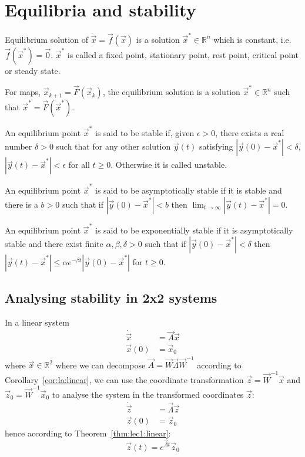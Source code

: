 \section{Equilibria and stability}
Equilibrium solution of $\dot{\vec x} = \vec f(\vec x)$ is a solution $\vec x^\ast \in \mathbb R^n$ which is constant, i.e. $\vec f(\vec x^\ast) = \vec 0$. $\vec x^\ast$ is called a fixed point, stationary point, rest point, critical point or steady state.

For maps, $\vec x_{k + 1} = \vec F(\vec x_k)$, the equilibrium solution is a solution $\vec x^\ast \in \mathbb R^n$ such that $\vec x^\ast = \vec F(\vec x^\ast)$.

\begin{definition}
An equilibrium point $\vec x^\ast$ is said to be stable if, given $\epsilon > 0$, there exists a real number $\delta > 0$ such that for any other solution $\vec y(t)$ satisfying $|\vec y(0) - \vec x^\ast| < \delta$, $|\vec y(t) - \vec x^\ast| < \epsilon$ for all $t \geq 0$. Otherwise it is called unstable.
\end{definition}

\begin{definition}
	An equilibrium point $\vec x^\ast$ is said to be asymptotically stable if it is stable and there is a $b > 0$ such that if $|\vec y(0) - \vec x^\ast| < b$ then $\lim_{t \to \infty} |\vec y(t) - \vec x^\ast| = 0$.
\end{definition}

\begin{definition}
	An equilibrium point $\vec x^\ast$ is said to be exponentially stable if it is asymptotically stable and there exist finite $\alpha, \beta, \delta > 0$ such that if $|\vec y(0) - \vec x^\ast| < \delta$ then $|\vec y(t) - \vec x^\ast| \leq \alpha e^{-\beta t} |\vec y(0) - \vec x^\ast|$ for $t \geq 0$.
\end{definition}

\subsection{Analysing stability in 2x2 systems}
In a linear system
\begin{align*}
	\dot{\vec x} &= \vec A \vec x \\
	\vec x(0)	 &= \vec x_0 
\end{align*}
where $\vec x \in \mathbb R^2$ where we can decompose $\vec A = \vec W \vec \Lambda \vec W^{-1}$ according to Corollary~\ref{cor:la:linear}, we can use the coordinate transformation $\vec z = \vec W^{-1} \vec x$ and $\vec z_0 = \vec W^{-1} \vec x_0$ to analyse the system in the transformed coordinates $\vec z$:
\begin{align*}
	\dot{\vec z} &= \vec \Lambda \vec z \\
	\vec z(0)	 &= \vec z_0
\end{align*}
hence according to Theorem~\ref{thm:lec1:linear}:
\begin{equation*}
	\vec z(t) = e^{\vec \Lambda t} \vec z_0
\end{equation*}

